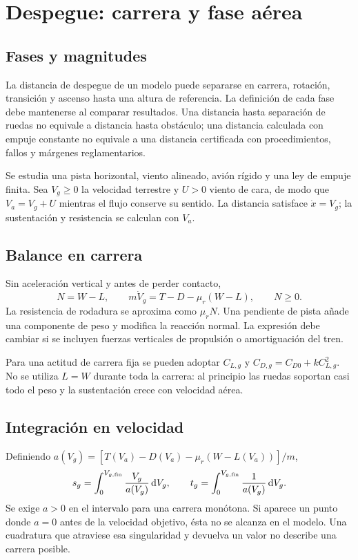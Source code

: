 \chapter{Despegue: carrera y fase aérea}\label{ch:takeoff}

\section{Fases y magnitudes}
La distancia de despegue de un modelo puede separarse en carrera, rotación, transición y ascenso hasta una altura de referencia. La definición de cada fase debe mantenerse al comparar resultados. Una distancia hasta separación de ruedas no equivale a distancia hasta obstáculo; una distancia calculada con empuje constante no equivale a una distancia certificada con procedimientos, fallos y márgenes reglamentarios.

Se estudia una pista horizontal, viento alineado, avión rígido y una ley de empuje finita. Sea $V_g\geq0$ la velocidad terrestre y $U>0$ viento de cara, de modo que $V_a=V_g+U$ mientras el flujo conserve su sentido. La distancia satisface $\dot x=V_g$; la sustentación y resistencia se calculan con $V_a$.

\section{Balance en carrera}
Sin aceleración vertical y antes de perder contacto,
\begin{equation}
N=W-L,\qquad
m\dot V_g=T-D-\mu_r(W-L),\qquad N\geq0.
\label{eq:takeoffroll}
\end{equation}
La resistencia de rodadura se aproxima como $\mu_rN$. Una pendiente de pista añade una componente de peso y modifica la reacción normal. La expresión debe cambiar si se incluyen fuerzas verticales de propulsión o amortiguación del tren.

Para una actitud de carrera fija se pueden adoptar $C_{L,g}$ y $C_{D,g}=C_{D0}+kC_{L,g}^2$. No se utiliza $L=W$ durante toda la carrera: al principio las ruedas soportan casi todo el peso y la sustentación crece con velocidad aérea.

\section{Integración en velocidad}
Definiendo $a(V_g)=[T(V_a)-D(V_a)-\mu_r(W-L(V_a))]/m$,
\begin{equation}
s_g=\int_0^{V_{g,\rm fin}}\frac{V_g}{a(V_g)}\,\mathrm{d} V_g,
\qquad t_g=\int_0^{V_{g,\rm fin}}\frac{1}{a(V_g)}\,\mathrm{d} V_g.
\label{eq:rollintegral}
\end{equation}
Se exige $a>0$ en el intervalo para una carrera monótona. Si aparece un punto donde $a=0$ antes de la velocidad objetivo, ésta no se alcanza en el modelo. Una cuadratura que atraviese esa singularidad y devuelva un valor no describe una carrera posible.

